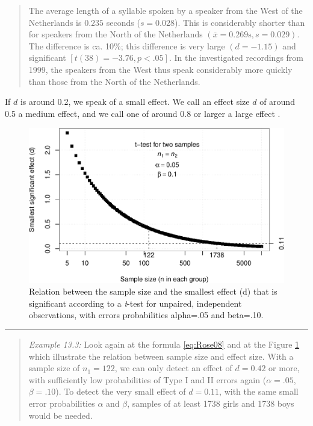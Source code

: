 \documentclass[
]{book}
\begin{document}
\begin{quote}
The average length of a syllable spoken by a speaker from
the West of the Netherlands is \(0.235\) seconds (\(s=0.028\)). This is
considerably shorter than for speakers from the North of the Netherlands
\((\overline{x}=0.269 \textrm{s}, s=0.029)\). The difference is ca. 10\%; this
difference is very large \((d=-1.15)\) and significant
\([t(38)=-3.76, p<.05]\). In the investigated recordings from 1999, the
speakers from the West thus speak considerably more quickly than those from
the North of the Netherlands.
\end{quote}

If \(d\) is around 0.2, we speak of a small effect. We call an effect size
\(d\) of around 0.5 a medium effect, and we call one
of around 0.8 or larger a large effect \citep{Cohen88, Rose08}.

\begin{figure}
\centering
\includegraphics{QMS-EN_files/figure-latex/smallestsignifdifference-1.pdf}
\caption{\label{fig:smallestsignifdifference}Relation between the sample size and the smallest effect (d) that is significant according to a \emph{t}-test for unpaired, independent observations, with errors probabilities alpha=.05 and beta=.10.}
\end{figure}

\begin{center}\rule{0.5\linewidth}{0.5pt}\end{center}

\begin{quote}
\emph{Example 13.3:}
Look again at the formula \eqref{eq:Rose08}
and at the Figure \ref{fig:smallestsignifdifference} which illustrate
the relation between sample size and effect size. With a sample size
of \(n_1=122\), we can only detect an effect of \(d=0.42\)
or more, with sufficiently low probabilities of Type I and II errors again
(\(\alpha=.05\), \(\beta=.10\)). To detect the very small effect of \(d=0.11\),
with the same small error probabilities \(\alpha\) and \(\beta\), samples
of at least 1738 girls and 1738 boys would be needed.
\end{quote}
\end{document}
